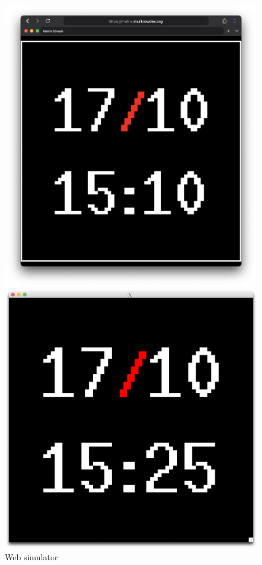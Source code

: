 \begin{figure}[h]
 \centering
 \begin{minipage}[b]{0.32\textwidth}
    \centering
    \includegraphics[width=\textwidth]{tesi/img/matrices/web.png}
    \caption*{Web simulator}
\end{minipage}
    \centering
    \begin{minipage}[b]{0.32\textwidth}
        \centering
        \includegraphics[width=\textwidth]{tesi/img/matrices/x11.png}

\end{minipage}
\end{figure}
